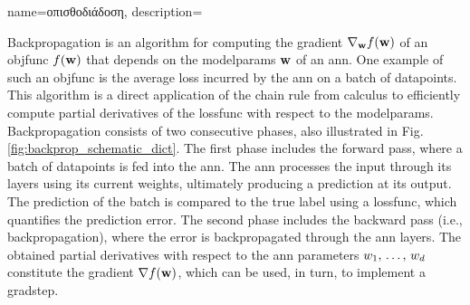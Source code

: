 {name={\foreignlanguage{greek}{οπισθοδιάδοση}},
 	description={Backpropagation is an \gls{algorithm} for computing the \gls{gradient} 
	 	$\nabla_{{\bf w}} f({\bf w})$ of an \gls{objfunc} $f({\bf w})$ that depends on the 
	  	\glspl{modelparam} ${\bf w}$ of an \gls{ann}. One example of such an \gls{objfunc} 
	  	is the average \gls{loss} incurred by the \gls{ann} on a \gls{batch} of \gls{datapoint}s. 
	  	This \gls{algorithm} is a direct application of the chain rule from calculus to 
	  	efficiently compute partial derivatives of the \gls{lossfunc} with respect to the \glspl{modelparam}.
		Backpropagation consists of two consecutive phases, also illustrated in Fig. \ref{fig:backprop_schematic_dict}. 
		The first phase includes the forward pass, where a \gls{batch} of 
		\gls{datapoint}s is fed into the \gls{ann}. The \gls{ann} processes the input through its \gls{layer}s using its current 
		\gls{weights}, ultimately producing a \gls{prediction} at its output. The \gls{prediction} of the \gls{batch} is compared to 
	   	the true \gls{label} using a \gls{lossfunc}, which quantifies the \gls{prediction} error. The second phase includes the 
		backward pass (i.e., backpropagation), where the error is backpropagated through the \gls{ann} \gls{layer}s. 
	   	The obtained partial derivatives with respect to the \gls{ann} \gls{parameter}s $w_{1},\,\ldots,\,w_{d}$ 
	   	constitute the \gls{gradient} $\nabla f({\bf w})$, which can be used, in turn, to implement a \gls{gradstep}. 
	   	\begin{figure}[H]
		\centering
\end{figure}}}
